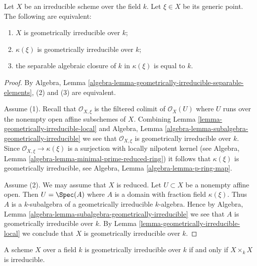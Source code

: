 \begin{lemma}
\label{lemma-geometrically-irreducible-function-field}
Let $X$ be an irreducible scheme over the field $k$. Let $\xi \in X$
be its generic point. The following are equivalent:
\begin{enumerate}
\item $X$ is geometrically irreducible over $k$;
\item $\kappa(\xi)$ is geometrically irreducible over $k$;
\item the separable algebraic closure of $k$ in $\kappa(\xi)$ is equal to $k$.
\end{enumerate}
\end{lemma}

\begin{proof}
By Algebra,
Lemma \ref{algebra-lemma-geometrically-irreducible-separable-elements},
(2) and (3) are equivalent.

\medskip\noindent
Assume (1). Recall that $\mathcal{O}_{X, \xi}$ is the filtered
colimit of $\mathcal{O}_X(U)$ where $U$ runs over the nonempty
open affine subschemes of $X$. Combining
Lemma \ref{lemma-geometrically-irreducible-local}
and
Algebra, Lemma \ref{algebra-lemma-subalgebra-geometrically-irreducible}
we see that $\mathcal{O}_{X, \xi}$ is geometrically irreducible over $k$.
Since $\mathcal{O}_{X, \xi} \to \kappa(\xi)$ is a surjection with
locally nilpotent kernel (see
Algebra, Lemma \ref{algebra-lemma-minimal-prime-reduced-ring})
it follows that $\kappa(\xi)$ is geometrically irreducible, see
Algebra, Lemma \ref{algebra-lemma-p-ring-map}.

\medskip\noindent
Assume (2). We may assume that $X$ is reduced. Let $U \subset X$ be
a nonempty affine open. Then $U = \Spec(A)$ where $A$ is a domain
with fraction field $\kappa(\xi)$. Thus $A$ is a $k$-subalgebra
of a geometrically irreducible $k$-algebra. Hence by
Algebra, Lemma \ref{algebra-lemma-subalgebra-geometrically-irreducible}
we see that $A$ is geometrically irreducible over $k$.
By Lemma \ref{lemma-geometrically-irreducible-local} we conclude
that $X$ is geometrically irreducible over $k$.
\end{proof}

\begin{lemma}
\label{lemma-geometrically-irreducible-self-product}
A scheme $X$ over a field $k$ is geometrically irreducible
over $k$ if and only if $X\times_k X$ is irreducible.
\end{lemma}


